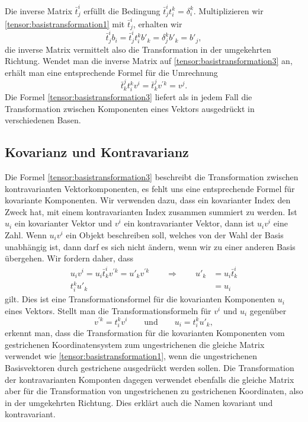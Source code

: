 Die inverse Matrix $\bar t_j^i$ erfüllt die Bedingung
$\bar t_j^i t_i^k=\delta_i^k$.
Multiplizieren wir \eqref{tensor:basistransformation1} mit $\bar t_j^i$,
erhalten wir
\begin{equation}
\bar t_j^i b_i
=
\bar t_j^i t_i^k b'_k
=
\delta_j^k b'_k
=
b'_j,
\end{equation}
die inverse Matrix vermittelt also die Transformation in der umgekehrten
Richtung.
Wendet man die inverse Matrix auf \eqref{tensor:basistransformation3} an,
erhält man eine entsprechende Formel für die Umrechnung 
\[
\bar t_k^j
t_i^k v^i
=
\bar t_k^j
v^{\prime k}
=
v^j.
\]
Die Formel \eqref{tensor:basistransformation3} liefert als in jedem Fall
die Transformation zwischen Komponenten eines Vektors ausgedrückt
in verschiedenen Basen.

\subsection{Kovarianz und Kontravarianz}
Die Formel \eqref{tensor:basistransformation3} beschreibt die Transformation
zwischen kontravarianten Vektorkomponenten, es fehlt uns eine entsprechende
Formel für kovariante Komponenten.
Wir verwenden dazu, dass ein kovarianter Index den Zweck hat, mit einem
kontravarianten Index zusammen summiert zu werden.
Ist $u_i$ ein kovarianter Vektor und $v^i$ ein kontravarianter Vektor,
dann ist $u_iv^i$ eine Zahl.
Wenn $u_iv^i$ ein Objekt beschreiben soll, welches von der Wahl der
Basis unabhängig ist, dann darf es sich nicht ändern, wenn wir zu einer
anderen Basis übergehen.
Wir fordern daher, dass 
\[
\begin{aligned}
u_iv^i
=
u_i \bar t^i_k v^{\prime k}
=
u'_k v^{\prime k}
\qquad\Rightarrow\qquad
u'_k
&=
u_i \bar t^i_k
\\
t^k_i
u'_k
&=
u_i
\end{aligned}
\]
gilt.
Dies ist eine Transformationsformel für die kovarianten Komponenten
$u_i$ eines Vektors.
Stellt man die Transformationsformeln für $v^i$ und $u_i$ gegenüber
\[
v^{\prime k}
=
t_i^k v^i
\qquad\text{und}\qquad
u_i
=
t^k_i
u'_k,
\]
erkennt man, dass die Transformation für die kovarianten Komponenten
vom gestrichenen Koordinatensystem zum ungestrichenen die gleiche Matrix
verwendet wie \eqref{tensor:basistransformation1}, wenn die 
ungestrichenen Basisvektoren durch gestrichene ausgedrückt werden sollen.
Die Transformation der kontravarianten Komponten dagegen verwendet ebenfalls
die gleiche Matrix aber für die Transformation von ungestrichenen
zu gestrichenen Koordinaten, also in der umgekehrten Richtung.
Dies erklärt auch die Namen kovariant und kontravariant.

